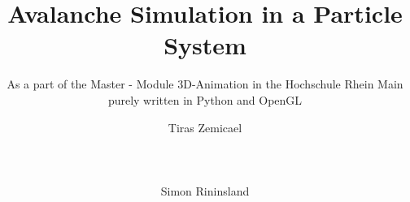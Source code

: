 \documentclass{sig-alternate-05-2015}
\begin{document}
\title{Avalanche Simulation in a Particle System}
\subtitle{As a part of the Master - Module 3D-Animation in the Hochschule Rhein Main
purely written in Python and OpenGL}
%
%
%
%
%

\author{
%
%
\alignauthor
Tiras Zemicael\\
       \\
       \\
       \\
\alignauthor
Simon Rininsland\\
       \\
}
\end{document}
